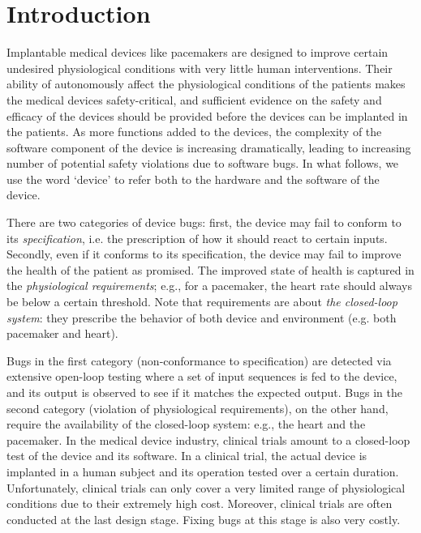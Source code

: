 \section{Introduction}
\label{introduction}

Implantable medical devices like pacemakers are designed to improve certain undesired physiological conditions with very little human interventions. 
Their ability of autonomously affect the physiological conditions of the patients makes the medical devices safety-critical, and sufficient evidence on the safety and efficacy of the devices should be provided before the devices can be implanted in the patients. 
As more functions added to the devices, the complexity of the software component of the device is increasing dramatically, leading to increasing number of potential safety violations due to software bugs. 
In what follows, we use the word `device' to refer both to the hardware and the software of the device.

There are two categories of device bugs: 
first, the device may fail to conform to its \emph{specification}, i.e. the prescription of how it should react to certain inputs.  
Secondly, even if it conforms to its specification, the device may fail to improve the health of the patient as promised. 
The improved state of health is captured in the \emph{physiological requirements}; e.g., for a pacemaker, the heart rate should always be below a certain threshold. 
Note that requirements are about \emph{the closed-loop system}: they prescribe the behavior of both device and environment (e.g. both pacemaker and heart).

Bugs in the first category (non-conformance to specification) are detected via extensive open-loop testing where a set of input sequences is fed to the device, and its output is observed to see if it matches the expected output.
Bugs in the second category (violation of physiological requirements), on the other hand, require the availability of the closed-loop system: e.g., the heart and the pacemaker. 
In the medical device industry, clinical trials amount to a closed-loop test of the device and its software. 
In a clinical trial, the actual device is implanted in a human subject and its operation tested over a certain duration.
Unfortunately, clinical trials can only cover a very limited range of physiological conditions due to their extremely high cost. 
Moreover, clinical trials are often conducted at the last design stage. Fixing bugs at this stage is also very costly.

